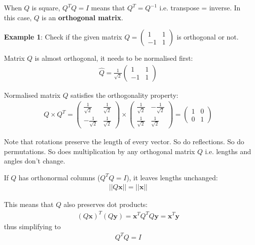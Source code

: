 \documentclass[10pt,a4paper]{article}
\begin{document}
\begin{tcolorbox}[breakable,colback=white]
    When $Q$ is square, $Q^T Q  = I$ means that $Q^T = Q^{-1}$ i.e. transpose = inverse. In this
    case, $Q$ is an \textbf{orthogonal matrix}. 
\end{tcolorbox}

\pagebreak

\textbf{Example 1}: Check if the given matrix $Q = \begin{pmatrix}
    1&1\\-1&1
\end{pmatrix}$ is orthogonal or not.

Matrix $Q$ is almost orthogonal, it needs to be normalised first:
\begin{align*}
    \hat{Q} = \frac{1}{\sqrt{2}} \begin{pmatrix}
        1&1\\-1&1
    \end{pmatrix}
\end{align*}

Normalised matrix $Q$ satisfies the orthogonality property:
\begin{align*}
    Q \times Q^T = \begin{pmatrix}
        \frac{1}{\sqrt{2}}&\frac{1}{\sqrt{2}} \\
        -\frac{1}{\sqrt{2}}&\frac{1}{\sqrt{2}}
    \end{pmatrix} \times \begin{pmatrix}
        \frac{1}{\sqrt{2}}&-\frac{1}{\sqrt{2}} \\
        \frac{1}{\sqrt{2}}&\frac{1}{\sqrt{2}}
    \end{pmatrix} = \begin{pmatrix}
        1&0\\0&1
    \end{pmatrix}
\end{align*}

Note that rotations preserve the length of every vector. So do reflections. So do permutations. 
So does multiplication by any orthogonal matrix $Q$ i.e. lengths and angles don't change.

\begin{tcolorbox}[breakable,colback=white]
    If $Q$ has orthonormal columns ($Q^T Q = I$), it leaves lengths unchanged:
    \begin{align*}
        ||Q \textbf{x}|| = ||\textbf{x}||
    \end{align*}

    This means that $Q$ also preserves dot products:
    \begin{align*}
        (Q \textbf{x})^T(Q \textbf{y}) = \textbf{x}^TQ^TQ\textbf{y} = \textbf{x}^T\textbf{y}
    \end{align*}
    thus simplifying to
    \begin{align*}
        Q^TQ = I
    \end{align*}
\end{tcolorbox}
\end{document}
